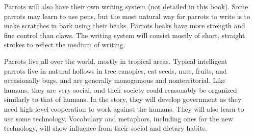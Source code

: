 Parrots will also have their own writing system (not detailed in this book).
Some parrots may learn to use pens, but
the most natural way for parrots to write is to make scratches in bark using their beaks.
Parrots beaks have more strength and fine control than claws.
The writing system will consist mostly of short, straight strokes to reflect the medium of writing.

Parrots live all over the world, mostly in tropical areas.
Typical intelligent parrots live in natural hollows in tree canopies,
eat seeds, nuts, fruits, and occasionally bugs,
and are generally monogamous and nonterritorial.
Like humans, they are very social,
and their society could reasonably be organized similarly to that of humans.
In the story, they will develop government as they need high-level cooperation
to work against the humans.
They will also learn to use some technology.
Vocabulary and metaphors, including ones for the new technology,
will show influence from their social and dietary habits.

